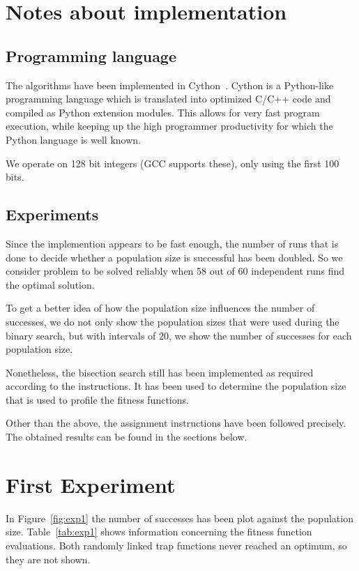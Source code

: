 \documentclass[12pt]{article}
\theoremstyle{definition}
\begin{document}
\maketitle

\section*{Notes about implementation}

\subsection*{Programming language}
The algorithms have been implemented in Cython~\cite{cython}.
Cython is a Python-like programming language which is translated into optimized
C/C++ code and compiled as Python extension modules.
This allows for very fast program execution, while keeping up the high programmer
productivity for which the Python language is well known.

We operate on 128 bit integers (GCC supports these), only using the first 100 bits.

\subsection*{Experiments}
Since the implemention appears to be fast enough, the number of runs that is done to decide whether a population size is successful has been doubled.
So we consider problem to be solved reliably when 58 out of 60 independent runs find the optimal solution.

To get a better idea of how the population size influences the number of successes, we do not only show the population sizes that were used during the binary search, but with intervals of 20, we show the number of successes for each population size.

Nonetheless, the bisection search still has been implemented as required according to the instructions.
It has been used to determine the population size that is used to profile the fitness functions.

Other than the above, the assignment instructions have been followed precisely.
The obtained results can be found in the sections below.


\section{First Experiment}
\label{ssec:exp1}
In Figure~\ref{fig:exp1} the number of successes has been plot against the population size.
Table~\ref{tab:exp1} shows information concerning the fitness function evaluations.
Both randomly linked trap functions never reached an optimum, so they are not shown.
\end{document}
